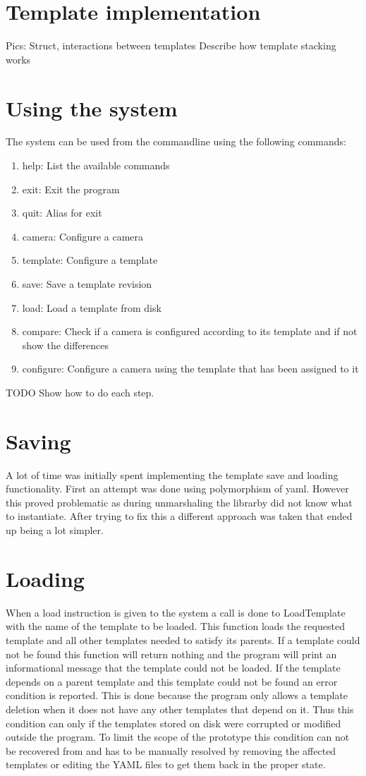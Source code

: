 \section{Template implementation}
Pics:
Struct, interactions between templates
Describe how template stacking works

\section{Using the system}
The system can be used from the commandline using the following commands:
\begin{enumerate}
\item help: List the available commands
\item exit: Exit the program
\item quit: Alias for exit
\item camera: Configure a camera
\item template: Configure a template
\item save: Save a template revision
\item load: Load a template from disk
\item compare: Check if a camera is configured according to its template and if not show the differences
\item configure: Configure a camera using the template that has been assigned to it
\end{enumerate}

TODO Show how to do each step.

\section{Saving}
A lot of time was initially spent implementing the template save and loading functionality.
First an attempt was done using polymorphism of yaml. However this proved problematic as during unmarshaling the librarby did not know what to instantiate.
After trying to fix this a different approach was taken that ended up being a lot simpler.

\section{Loading}
When a load instruction is given to the system a call is done to LoadTemplate with the name of the template to be loaded.
This function loads the requested template and all other templates needed to satisfy its parents.
If a template could not be found this function will return nothing and the program will print an informational message that the template could not be loaded.
If the template depends on a parent template and this template could not be found an error condition is reported.
This is done because the program only allows a template deletion when it does not have any other templates that depend on it.
Thus this condition can only if the templates stored on disk were corrupted or modified outside the program.
To limit the scope of the prototype this condition can not be recovered from and has to be manually resolved by removing the affected templates or editing the YAML files to get them back in the proper state.

